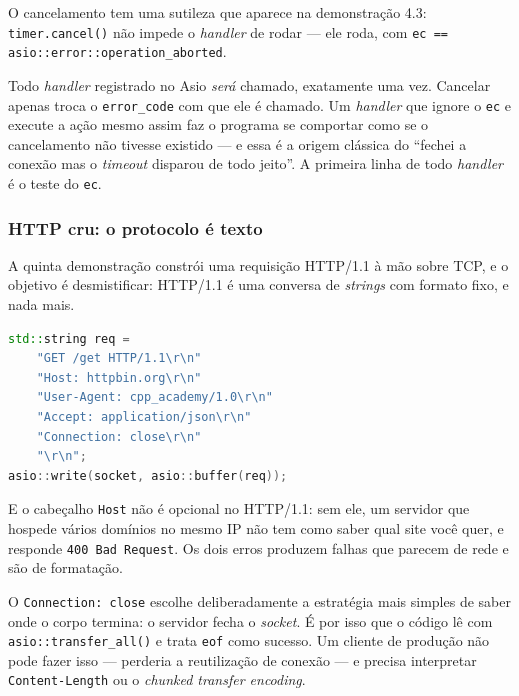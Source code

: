 O cancelamento tem uma sutileza que aparece na demonstração 4.3:
\texttt{timer.cancel()} não impede o \emph{handler} de rodar --- ele roda, com
\texttt{ec == asio::error::operation\_aborted}.

\begin{armadilha}
Todo \emph{handler} registrado no Asio \emph{será} chamado, exatamente uma vez.
Cancelar apenas troca o \texttt{error\_code} com que ele é chamado. Um
\emph{handler} que ignore o \texttt{ec} e execute a ação mesmo assim faz o
programa se comportar como se o cancelamento não tivesse existido --- e essa é
a origem clássica do ``fechei a conexão mas o \emph{timeout} disparou de todo
jeito''. A primeira linha de todo \emph{handler} é o teste do \texttt{ec}.
\end{armadilha}

\subsubsection{HTTP cru: o protocolo é texto}

A quinta demonstração constrói uma requisição HTTP/1.1 à mão sobre TCP, e o
objetivo é desmistificar: HTTP/1.1 é uma conversa de \emph{strings} com formato
fixo, e nada mais.

\begin{lstlisting}[style=bt, language=C++,
    caption={\texttt{src/network/demo\_http\_raw.hpp}: a requisição inteira. A
             linha vazia final é obrigatória --- é ela que marca o fim dos
             cabeçalhos.}]
std::string req =
    "GET /get HTTP/1.1\r\n"
    "Host: httpbin.org\r\n"
    "User-Agent: cpp_academy/1.0\r\n"
    "Accept: application/json\r\n"
    "Connection: close\r\n"
    "\r\n";
asio::write(socket, asio::buffer(req));
\end{lstlisting}

\begin{armadilha}
E o cabeçalho \texttt{Host} não é opcional no HTTP/1.1: sem ele, um servidor
que hospede vários domínios no mesmo IP não tem como saber qual site você quer,
e responde \texttt{400 Bad Request}. Os dois erros produzem falhas que parecem
de rede e são de formatação.
\end{armadilha}

O \texttt{Connection: close} escolhe deliberadamente a estratégia mais simples
de saber onde o corpo termina: o servidor fecha o \emph{socket}. É por isso que
o código lê com \texttt{asio::transfer\_all()} e trata \texttt{eof} como
sucesso. Um cliente de produção não pode fazer isso --- perderia a reutilização
de conexão --- e precisa interpretar \texttt{Content-Length} ou o
\emph{chunked transfer encoding}.

